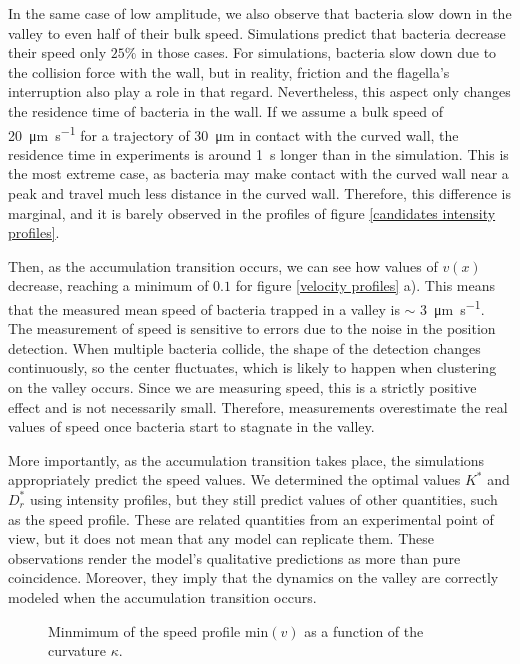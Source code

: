 In the same case of low amplitude, we also observe that bacteria slow down in the valley to even half of their bulk speed. Simulations predict that bacteria decrease their speed only $25\%$ in those cases. For simulations, bacteria slow down due to the collision force with the wall, but in reality, friction and the flagella's interruption also play a role in that regard. Nevertheless, this aspect only changes the residence time of bacteria in the wall. If we assume a bulk speed of \SI[per-mode = symbol]{20}{\micro\meter\per\second} for a trajectory of \SI{30}{\micro\meter} in contact with the curved wall, the residence time in experiments is around \SI{1}{\second} longer than in the simulation. This is the most extreme case, as bacteria may make contact with the curved wall near a peak and travel much less distance in the curved wall. Therefore, this difference is marginal, and it is barely observed in the profiles of figure \ref{candidates intensity profiles}.

Then, as the accumulation transition occurs, we can see how values of $v(x)$ decrease, reaching a minimum of $0.1$ for figure \ref{velocity profiles} a). This means that the measured mean speed of bacteria trapped in a valley is $\sim$ \SI[per-mode = symbol]{3}{\micro\meter\per\second}. The measurement of speed is sensitive to errors due to the noise in the position detection. When multiple bacteria collide, the shape of the detection changes continuously, so the center fluctuates, which is likely to happen when clustering on the valley occurs. Since we are measuring speed, this is a strictly positive effect and is not necessarily small. Therefore, measurements overestimate the real values of speed once bacteria start to stagnate in the valley.

\newpage

More importantly, as the accumulation transition takes place, the simulations appropriately predict the speed values. We determined the optimal values $K^*$ and $D_r^*$ using intensity profiles, but they still predict values of other quantities, such as the speed profile. These are related quantities from an experimental point of view, but it does not mean that any model can replicate them. These observations render the model's qualitative predictions as more than pure coincidence. Moreover, they imply that the dynamics on the valley are correctly modeled when the accumulation transition occurs.

\begin{figure}
\vspace{-20pt}
\centering

\caption[Minmimum of the speed profile as a function of the curvature]{Minmimum of the speed profile $\text{min}(v)$ as a function of the curvature $\kappa$.}
\vspace{-15pt}
\label{minv_curvature}
\end{figure}

